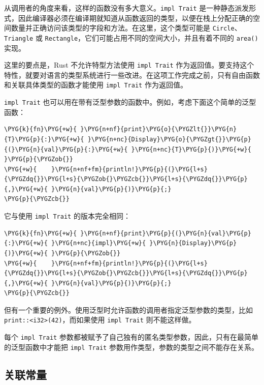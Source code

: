从调用者的角度来看，这样的函数没有多大意义。\texttt{impl Trait} 是一种静态派发形式，因此编译器必须在编译期就知道从函数返回的类型，以便在栈上分配正确的空间数量并正确访问该类型的字段和方法。在这里，这个类型可能是 \texttt{Circle}、\texttt{Triangle} 或 \texttt{Rectangle}，它们可能占用不同的空间大小，并且有着不同的 \texttt{area()} 实现。

这里的要点是，Rust 不允许特型方法使用 \texttt{impl Trait} 作为返回值。要支持这个特性，就要对语言的类型系统进行一些改进。在这项工作完成之前，只有自由函数和关联具体类型的函数才能使用 \texttt{impl Trait} 作为返回值。

\texttt{impl Trait} 也可以用在带有泛型参数的函数中。例如，考虑下面这个简单的泛型函数：

\begin{Verbatim}[commandchars=\\\{\},breaklines=true,breakanywhere=true,fontsize=\codefont,xleftmargin=17bp]
\PYG{k}{fn}\PYG{+w}{ }\PYG{n+nf}{print}\PYG{o}{\PYGZlt{}}\PYG{n}{T}\PYG{p}{:}\PYG{+w}{ }\PYG{n+nc}{Display}\PYG{o}{\PYGZgt{}}\PYG{p}{(}\PYG{n}{val}\PYG{p}{:}\PYG{+w}{ }\PYG{n+nc}{T}\PYG{p}{)}\PYG{+w}{ }\PYG{p}{\PYGZob{}}
\PYG{+w}{    }\PYG{n+nf+fm}{println!}\PYG{p}{(}\PYG{l+s}{\PYGZdq{}}\PYG{l+s}{\PYGZob{}\PYGZcb{}}\PYG{l+s}{\PYGZdq{}}\PYG{p}{,}\PYG{+w}{ }\PYG{n}{val}\PYG{p}{)}\PYG{p}{;}
\PYG{p}{\PYGZcb{}}
\end{Verbatim}

它与使用 \texttt{impl Trait} 的版本完全相同：

\begin{Verbatim}[commandchars=\\\{\},breaklines=true,breakanywhere=true,fontsize=\codefont,xleftmargin=17bp]
\PYG{k}{fn}\PYG{+w}{ }\PYG{n+nf}{print}\PYG{p}{(}\PYG{n}{val}\PYG{p}{:}\PYG{+w}{ }\PYG{n+nc}{impl}\PYG{+w}{ }\PYG{n}{Display}\PYG{p}{)}\PYG{+w}{ }\PYG{p}{\PYGZob{}}
\PYG{+w}{    }\PYG{n+nf+fm}{println!}\PYG{p}{(}\PYG{l+s}{\PYGZdq{}}\PYG{l+s}{\PYGZob{}\PYGZcb{}}\PYG{l+s}{\PYGZdq{}}\PYG{p}{,}\PYG{+w}{ }\PYG{n}{val}\PYG{p}{)}\PYG{p}{;}
\PYG{p}{\PYGZcb{}}
\end{Verbatim}

但有一个重要的例外。使用泛型时允许函数的调用者指定泛型参数的类型，比如 \texttt{print::<i32>(42)}，而如果使用 \texttt{impl Trait} 则不能这样做。

每个 \texttt{impl Trait} 参数都被赋予了自己独有的匿名类型参数，因此，只有在最简单的泛型函数中才能把 \texttt{impl Trait} 参数用作类型，参数的类型之间不能存在关系。

\subsection{关联常量}

